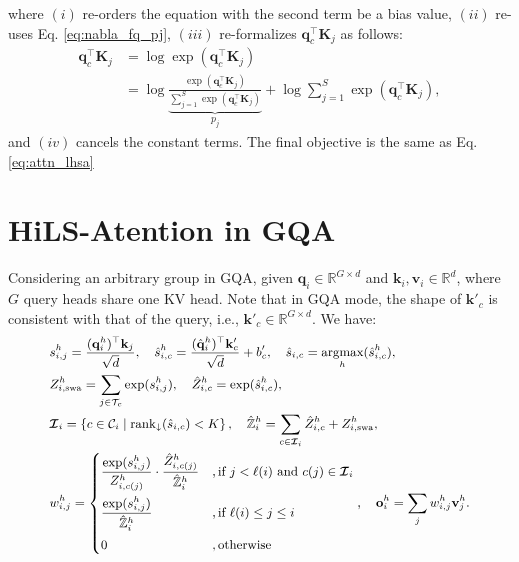 where $(i)$ re-orders the equation with the second term be a bias value, $(ii)$ re-uses Eq. \ref{eq:nabla_fq_pj}, $(iii)$ re-formalizes $\boldsymbol{q}_c^\top\mathbf{K}_j$ as follows:
\begin{align}
    \boldsymbol{q}_c^\top\mathbf{K}_j &= \log\exp(\boldsymbol{q}_c^\top\mathbf{K}_j) \nonumber \\
    &= \log\underbrace{\frac{\exp({\boldsymbol{q}_c^\top\mathbf{K}_j})}{\sum_{j=1}^{S}\exp({\boldsymbol{q}_c^\top\mathbf{K}_j})}}_{p_j} + \log\sum_{j=1}^{S}\exp({\boldsymbol{q}_c^\top\mathbf{K}_j}), \label{eq:qk_new_form}
\end{align}
and $(iv)$ cancels the constant terms. The final objective is the same as Eq. \ref{eq:attn_lhsa}  


\section{HiLS-Atention in GQA}\label{appdx:hils-attn-gqa}
Considering an arbitrary group in GQA, given $\mathbf{q}_i \in \mathbb{R}^{G \times d}$ and $\mathbf{k}_i, \mathbf{v}_i \in \mathbb{R}^{d}$, where $G$ query heads share one KV head.
Note that in GQA mode, the shape of $\mathbf{k}'_c$ is consistent with that of the query, i.e., $\mathbf{k}'_c \in \mathbb{R}^{G \times d}$.
We have:
\begin{equation}
\label{eq:hils_gqa}
\small
\begin{aligned}
    &s_{i,j}^h = \frac{(\mathbf{q}_i^h)^\top \mathbf{k}_j}{\sqrt{d}},\quad
    \hat{s}^h_{i,c} = \frac{(\hat{\mathbf{q}}_i^h)^\top \mathbf{k}'_c}{\sqrt{d}} + b'_{c}, \quad \hat{s}_{i,c} = \underset{h}{\text{argmax}}(\hat{s}^h_{i,c}), \\
    & Z^h_{i,\text{swa}}=\sum_{j\in \mathcal{T}_c}{\exp(s^h_{i,j})},\quad \hat{Z}^h_{i,c}=\exp(\hat{s}_{i,c}^h),\\
    &\bm{\mathcal{I}}_i = \left\{ c \in \mathcal{C}_i \mid \operatorname{rank}_{\downarrow}(\hat{s}_{i,c}) < K \right\}, \quad \hat{\mathbb{Z}}^h_i = \sum_{c \in \bm{\mathcal{I}}_i} \hat{Z}^h_{i,c} + Z^h_{i,\text{swa}}, \\
    &w^h_{i,j} = \begin{cases}
    \displaystyle \frac{\exp(s^h_{i,j})}{Z^h_{i,c(j)}} \cdot \frac{\hat{Z}^h_{i,c(j)}}{\hat{\mathbb{Z}}^h_i} & ,\text{if } j < \ell(i) \text{ and } c(j) \in \bm{\mathcal{I}}_i \\[1.2em]
    \displaystyle \frac{\exp(s^h_{i,j})}{\hat{\mathbb{Z}}^h_i} & ,\text{if } \ell(i) \le j \le i \\[1.2em]
    0 & ,\text{otherwise}
    \end{cases}, \quad \mathbf{o}^h_i = \sum_j w^h_{i,j}\mathbf{v}^h_j.
\end{aligned}
\end{equation}


